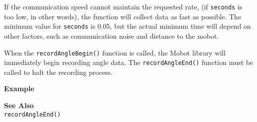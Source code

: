 If the communication speed cannot maintain 
the requested rate, (if \texttt{seconds} is too low, in other words), the function will
collect data as fast as possible. The minimum value for \texttt{seconds} is 0.05, but
the actual minimum time will depend on other factors, such as communication noise and
distance to the mobot.

When the \texttt{recordAngleBegin()} function is called, the Mobot library will 
immediately begin recording angle data. The \texttt{recordAngleEnd()} function
must be called to halt the recording process. 

\noindent
{\bf Example}\\
\noindent

\noindent
{\bf See Also}\\
\texttt{recordAngleEnd()} \\
